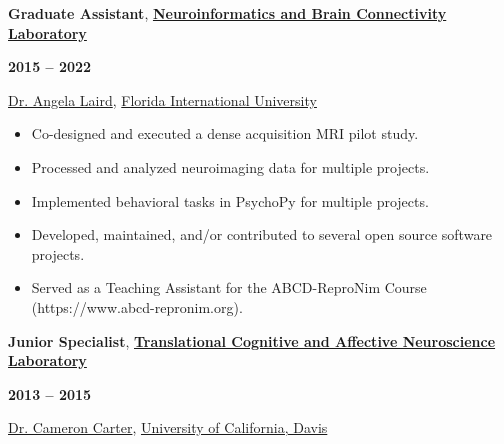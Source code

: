 \documentclass[10pt]{article}
\begin{document}
\begin{minipage}[t]{.8\linewidth}
	\flushleft
	\noindent
	\textbf{Graduate Assistant},
	\href{https://nbclab.github.io}
	{\textbf{Neuroinformatics and Brain Connectivity Laboratory}}
	\end{minipage}
	\hfill
	\begin{minipage}[t]{.2\linewidth}
	\flushright
	\noindent
	\textsc{\textbf{2015 -- 2022}}
\end{minipage}

\href{https://nbclab.github.io/team/laird-angela}{Dr. Angela Laird},
\href{http://www.fiu.edu}{Florida International University}

\begin{itemize}[noitemsep, nolistsep]

\item Co-designed and executed a dense acquisition MRI pilot study.

\item Processed and analyzed neuroimaging data for multiple projects.

\item Implemented behavioral tasks in PsychoPy for multiple projects.

\item Developed, maintained, and/or contributed to several open source software projects.

\item Served as a Teaching Assistant for the ABCD-ReproNim Course (https://www.abcd-repronim.org).

\end{itemize}

\bigskip

\begin{minipage}[t]{.85\linewidth}
	\flushleft
	\noindent
	\textbf{Junior Specialist},
	\href{http://carterlab.ucdavis.edu/front/index.php}
	{\textbf{Translational Cognitive and Affective Neuroscience Laboratory}}
	\end{minipage}
	\hfill
	\begin{minipage}[t]{.15\linewidth}
	\flushright
	\noindent
	\textsc{\textbf{2013 -- 2015}}
\end{minipage}

\href{http://carterlab.ucdavis.edu/people/carter.php}{Dr. Cameron Carter},
\href{https://www.ucdavis.edu}{University of California, Davis}
\end{document}
